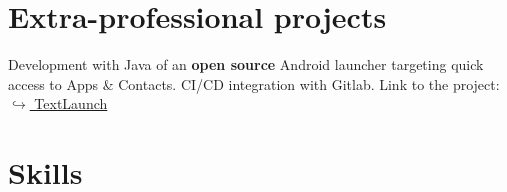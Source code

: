 \documentclass[10pt,a4paper,sans]{moderncv}%
\begin{document}
\section{Extra-professional projects}
    {Development with Java of an \textbf{open source} Android launcher targeting quick access to Apps \& Contacts. CI/CD integration with Gitlab. Link to the project: \href{https://gitlab.com/MisterFruits/TextLaunch}{$\hookrightarrow$ TextLaunch}}


\section{Skills}

\end{document}
